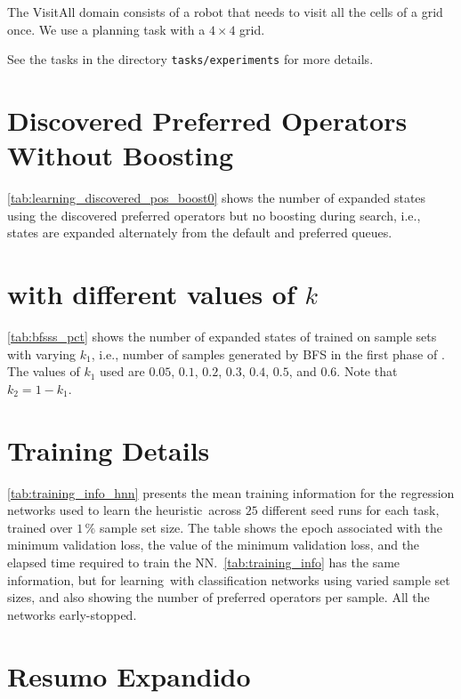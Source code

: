\documentclass[ppgc,diss,english]{iiufrgs}
\begin{document}
The VisitAll domain consists of a robot that needs to visit all the cells of a grid once. We use a planning task with a $4 \times 4$ grid.

See the tasks in the directory \texttt{tasks/experiments} for more details.

\chapter[Preferred Operators Without Boosting]{Discovered Preferred Operators Without Boosting}
\label{cha:discovered_pos_boost0}
\cref{tab:learning_discovered_pos_boost0} shows the number of expanded states using the discovered preferred operators \pog but no boosting during search, i.e., states are expanded alternately from the default and preferred queues.



\chapter{\bfsrs with different values of $k$}
\label{cha:bfsss_pct}

\cref{tab:bfsss_pct} shows the number of expanded states of \pog trained on sample sets with varying $k_{1}$, i.e., number of samples generated by BFS in the first phase of \bfsrs. The values of $k_{1}$ used are $0.05$, $0.1$, $0.2$, $0.3$, $0.4$, $0.5$, and $0.6$. Note that $k_{2} = 1 - k_{1}$.



\chapter{Training Details}
\label{cha:training_details}

\cref{tab:training_info_hnn} presents the mean training information for the regression networks used to learn the heuristic~\hnn across $25$ different seed runs for each task, trained over $1\,\%$ sample set size. The table shows the epoch associated with the minimum validation loss, the value of the minimum validation loss, and the elapsed time required to train the NN.~\cref{tab:training_info} has the same information, but for learning~\pog with classification networks using varied sample set sizes, and also showing the number of preferred operators per sample. All the networks early-stopped.



\chapter{Resumo Expandido}
\noindent
\end{document}
